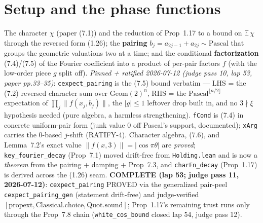 \section{Setup and the phase functions}

\begin{definition}\label{X1}
  \leanok
The character \(\chi\) (paper (7.1)) and the reduction of Prop~1.17 to a bound on
\(\mathbb{E}\,\chi\) through the reversed form (1.26); the \textbf{pairing}
\(b_j = a_{2j-1}+a_{2j}\sim\mathrm{Pascal}\) that groups the geometric valuations two at a
time; and the conditional \textbf{factorization} (7.4)/(7.5) of the Fourier coefficient into a
product of per-pair factors \(f\) (with the low-order piece \(g\) split off).
\emph{Pinned + ratified 2026-07-12 (judge pass 10, lap 53, paper pp.33--35)}:
\texttt{cexpect\_pairing} is the (7.5) bound verbatim --- LHS = the (7.2) reversed character
sum over \(\mathrm{Geom}(2)^n\), RHS = the \(\mathrm{Pascal}^{\lfloor n/2\rfloor}\)
expectation of \(\prod_j \|f(x_j,b_j)\|\), the \(|g|\le 1\) leftover drop built in, and no
\(3\nmid\xi\) hypothesis needed (pure algebra, a harmless strengthening).  \texttt{fCond} is
(7.4) in concrete uniform-pair form (junk value \(0\) off Pascal's support, documented);
\texttt{xArg} carries the 0-based \(j\)-shift (RATIFY-4).  Character algebra, (7.6), and
Lemma~7.2's exact value \(\|f(x,3)\| = |\cos\pi\theta|\) are \emph{proved};
\texttt{key\_fourier\_decay} (Prop~7.1) moved drift-free from \texttt{Holding.lean} and is
now a \emph{theorem} from the pairing + damping + Prop~7.3, and \texttt{charFn\_decay}
(Prop~1.17) is derived across the (1.26) seam.
\textbf{COMPLETE (lap 53; judge pass 11, 2026-07-12)}: \texttt{cexpect\_pairing} PROVED via
the generalized pair-peel \texttt{cexpect\_pairing\_gen} (statement drift-free) and
judge-verified \([\mathrm{propext}, \mathrm{Classical.choice}, \mathrm{Quot.sound}]\);
Prop~1.17's remaining trust runs only through the Prop~7.8 chain
(\texttt{white\_cos\_bound} closed lap 54, judge pass 12).
\end{definition}

